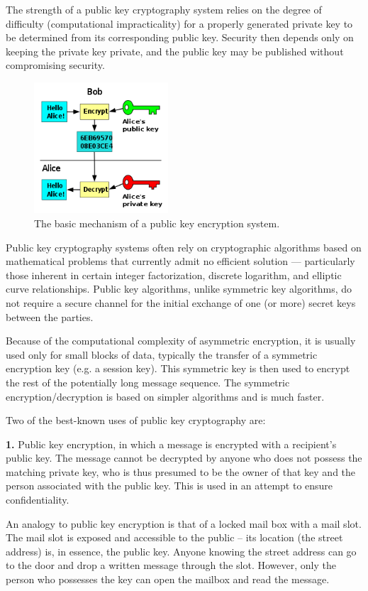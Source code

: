 \documentclass[12 pt]{article}
\begin{document}
The strength of a public key cryptography system relies on the degree of difficulty (computational impracticality) for a properly generated private key to be determined from its corresponding public key. Security then depends only on keeping the private key private, and the public key may be published without compromising security.


\begin{figure}[h!]
  \includegraphics[width=50mm]{250px-Public_key_encryption.png}
  \centering
  \caption{The basic mechanism of a public key encryption system.}
  \label{fig:PublicKey-Basic}
\end{figure}

Public key cryptography systems often rely on cryptographic algorithms based on mathematical problems that currently admit no efficient solution — particularly those inherent in certain integer factorization, discrete logarithm, and elliptic curve relationships. Public key algorithms, unlike symmetric key algorithms, do not require a secure channel for the initial exchange of one (or more) secret keys between the parties.

Because of the computational complexity of asymmetric encryption, it is usually used only for small blocks of data, typically the transfer of a symmetric encryption key (e.g. a session key). This symmetric key is then used to encrypt the rest of the potentially long message sequence. The symmetric encryption/decryption is based on simpler algorithms and is much faster.

\noindent
Two of the best-known uses of public key cryptography are:

\textbf{1. }Public key encryption, in which a message is encrypted with a recipient's public key. The message cannot be decrypted by anyone who does not possess the matching private key, who is thus presumed to be the owner of that key and the person associated with the public key. This is used in an attempt to ensure confidentiality.

An analogy to public key encryption is that of a locked mail box with a mail slot. The mail slot is exposed and accessible to the public – its location (the street address) is, in essence, the public key. Anyone knowing the street address can go to the door and drop a written message through the slot. However, only the person who possesses the key can open the mailbox and read the message.
\end{document}
